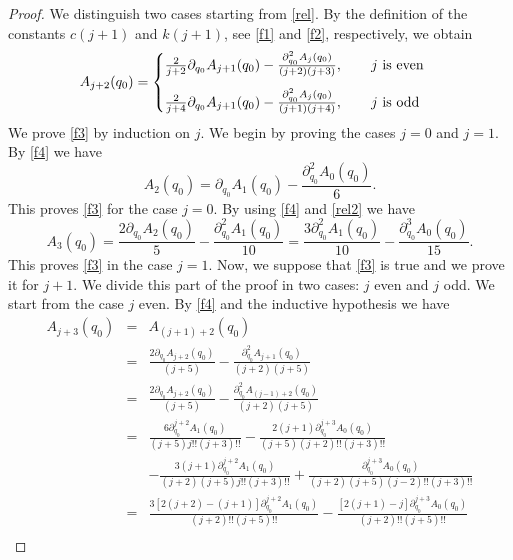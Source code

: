 \documentclass[reqno,11pt]{amsart}
\numberwithin{equation}{section}
\theoremstyle{definition}
\begin{document}
\begin{proof}
We distinguish two cases starting from \eqref{rel}. By the definition of the constants $c(j+1)$ and $k(j+1)$, see \eqref{f1} and \eqref{f2}, respectively, we obtain
	\begin{equation}
		\label{f4}
		A_{j+2}(q_0)
		=
		\begin{cases}
			\vspace{3mm}
			\frac{2}{j+2} \partial_{q_0} A_{j+1}(q_0)-\frac{\partial_{q_0}^2 A_j(q_0)}{(j+2)(j+3) }, \qquad j \, \, \hbox{is even}\\
			\frac{2}{j+4} \partial_{q_0} A_{j+1}(q_0)-\frac{\partial_{q_0}^2 A_j(q_0)}{(j+1)(j+4) }, \qquad j \, \, \hbox{is odd}
		\end{cases}
	\end{equation}
	We prove \eqref{f3} by induction on $j$. We begin by proving the cases $j=0$ and $j=1$. By \eqref{f4} we have
	\begin{equation}
		\label{rel2}
		A_2(q_0)= \partial_{q_0} A_1(q_0)-\frac{\partial_{q_0}^2 A_0(q_0)}{6}.
	\end{equation}
	This proves \eqref{f3} for the case $j=0$. By using \eqref{f4} and \eqref{rel2} we have
	$$ A_3(q_0)=\frac{2 \partial_{q_0} A_2(q_0)}{5}-\frac{\partial_{q_0}^2 A_1(q_0)}{10}=\frac{3\partial_{q_0}^2A_1(q_0)}{10}-\frac{\partial_{q_0}^3 A_0(q_0)}{15}.$$
	This proves \eqref{f3} in the case $j=1$. Now, we suppose that \eqref{f3} is true and we prove it for $j+1$. We divide this part of the proof in two cases: $j$ even and $j$ odd. We start from the case $j$ even. By \eqref{f4} and the inductive hypothesis we have
				\begingroup\allowdisplaybreaks
	\begin{eqnarray*}
		A_{j+3}(q_0)&=&A_{(j+1)+2}(q_0)\\
		&=& \frac{2 \partial_{q_0} A_{j+2}(q_0)}{(j+5)}-\frac{\partial_{q_0}^2 A_{j+1}(q_0)}{(j+2)(j+5)}\\
		&=& \frac{2 \partial_{q_0} A_{j+2}(q_0)}{(j+5)}-\frac{\partial_{q_0}^2 A_{(j-1)+2}(q_0)}{(j+2)(j+5)}\\
		&=& \frac{6 \partial_{q_0}^{j+2} A_1(q_0)}{(j+5) j!! (j+3)!!}- \frac{2(j+1) \partial_{q_0}^{j+3} A_0(q_0)}{(j+5) (j+2)!! (j+3)!!}\\
		&&-\frac{3(j+1)\partial_{q_0}^{j+2}A_1(q_0)}{(j+2) (j+5)j!! (j+3)!!}+\frac{\partial_{q_0}^{j+3}A_0(q_0)}{(j+2)(j+5) (j-2)!! (j+3)!!}\\
		&=& \frac{3[2(j+2)-(j+1)] \partial_{q_0}^{j+2}A_1(q_0)}{(j+2)!!(j+5)!!}- \frac{[2(j+1)-j] \partial_{q_0}^{j+3}A_0(q_0)}{(j+2)!! (j+5)!!}\\

\end{eqnarray*}
\end{proof}
\end{document}
